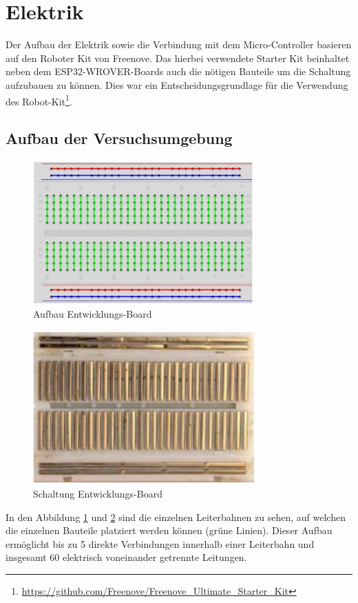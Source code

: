 \documentclass[conference,compsoc,final,a4paper]{IEEEtran}
\begin{document}
\section{Elektrik}
Der Aufbau der Elektrik sowie die Verbindung mit dem Micro-Controller basieren auf den Roboter Kit von Freenove. 
Das hierbei verwendete Starter Kit beinhaltet neben dem ESP32-WROVER-Boards auch die nötigen Bauteile um die Schaltung aufzubauen zu können. 
Dies war ein Entscheidungsgrundlage für die Verwendung des Robot-Kit\footnote{\url{https://github.com/Freenove/Freenove\_Ultimate\_Starter\_Kit}}.

\subsection{Aufbau der Versuchsumgebung}
\begin{figure}[h]
\centering
\includegraphics[width=8.5cm]{../images/board.png}
\caption{Aufbau Entwicklungs-Board\autocite{freenoveTutorial}}\label{Elektrik:DevBoard}
\end{figure}

\begin{figure}[h]
\centering
\includegraphics[width=8.5cm]{../images/board2.png}
\caption{Schaltung Entwicklungs-Board\autocite{freenoveTutorial}}\label{Elektrik:DevBoardInternal}
\end{figure}

In den Abbildung \ref{Elektrik:DevBoard} und \ref{Elektrik:DevBoardInternal} sind die einzelnen Leiterbahnen zu sehen, auf welchen die einzelnen Bauteile platziert werden können (grüne Linien). 
Dieser Aufbau ermöglicht bis zu 5 direkte Verbindungen innerhalb einer Leiterbahn und insgesamt 60 elektrisch voneinander getrennte Leitungen.
\end{document}
